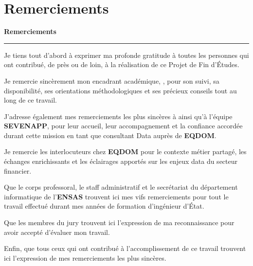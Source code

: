 \chapter*{Remerciements}

\begin{center}
\vspace*{0.5cm}
{\Large\bfseries Remerciements}\\[0.25cm]
{\color{softline}\rule{0.38\textwidth}{0.7pt}}
\end{center}

\vspace{0.8cm}

\begingroup
\setlength{\parindent}{0pt}
\setlength{\parskip}{0.55cm}

Je tiens tout d'abord à exprimer ma profonde gratitude à toutes les personnes qui ont contribué, de près ou de loin, à la réalisation de ce Projet de Fin d'Études.

Je remercie sincèrement mon encadrant académique, \textbf{\EncadrantAcademique}, pour son suivi, sa disponibilité, ses orientations méthodologiques et ses précieux conseils tout au long de ce travail.

J'adresse également mes remerciements les plus sincères à \textbf{\EncadrantPro} ainsi qu'à l'équipe \textbf{SEVENAPP}, pour leur accueil, leur accompagnement et la confiance accordée durant cette mission en tant que consultant Data auprès de \textbf{EQDOM}.

Je remercie les interlocuteurs chez \textbf{EQDOM} pour le contexte métier partagé, les échanges enrichissants et les éclairages apportés sur les enjeux data du secteur financier.

Que le corps professoral, le staff administratif et le secrétariat du département informatique de l'\textbf{ENSAS} trouvent ici mes vifs remerciements pour tout le travail effectué durant mes années de formation d'ingénieur d'État.

Que les membres du jury trouvent ici l'expression de ma reconnaissance pour avoir accepté d'évaluer mon travail.

Enfin, que tous ceux qui ont contribué à l'accomplissement de ce travail trouvent ici l'expression de mes remerciements les plus sincères.

\endgroup

\vspace{0.7cm}
\begin{flushright}
\textit{\NomEtudiant}
\end{flushright}

\clearpage
